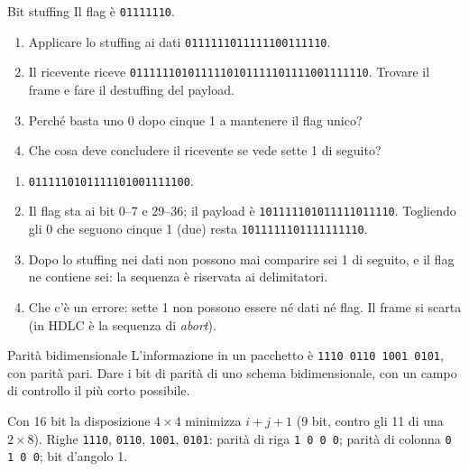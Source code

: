\begin{esercizio}{Bit stuffing}
Il flag è \texttt{01111110}.
\begin{enumerate}[label=(\alph*)]
    \item Applicare lo stuffing ai dati \texttt{0111111011111100111110}.
    \item Il ricevente riceve \texttt{0111111010111110101111101111001111110}. Trovare il frame e fare il destuffing del payload.
    \item Perché basta uno 0 dopo cinque 1 a mantenere il flag unico?
    \item Che cosa deve concludere il ricevente se vede sette 1 di seguito?
\end{enumerate}

\svolgimento
\begin{enumerate}[label=(\alph*)]
    \item \texttt{011111\textcolor{netred}{0}1011111\textcolor{netred}{0}10011111\textcolor{netred}{0}0}.
    \item Il flag sta ai bit 0--7 e 29--36; il payload è \texttt{101111101011111011110}. Togliendo gli 0 che seguono cinque 1 (due) resta
          \texttt{1011111101111111110}.
    \item Dopo lo stuffing nei dati non possono mai comparire sei 1 di seguito, e il flag ne contiene sei: la sequenza è riservata ai
          delimitatori.
    \item Che c'è un errore: sette 1 non possono essere né dati né flag. Il frame si scarta (in HDLC è la sequenza di \emph{abort}).
\end{enumerate}
\end{esercizio}

\begin{esercizio}{Parità bidimensionale}
L'informazione in un pacchetto è \texttt{1110 0110 1001 0101}, con parità pari. Dare i bit di parità di uno schema bidimensionale, con un
campo di controllo il più corto possibile.

\svolgimento
Con 16 bit la disposizione $4 \times 4$ minimizza $i + j + 1$ (9 bit, contro gli 11 di una $2 \times 8$). Righe \texttt{1110},
\texttt{0110}, \texttt{1001}, \texttt{0101}: parità di riga \texttt{1 0 0 0}; parità di colonna \texttt{0 1 0 0}; bit d'angolo 1.
\end{esercizio}

